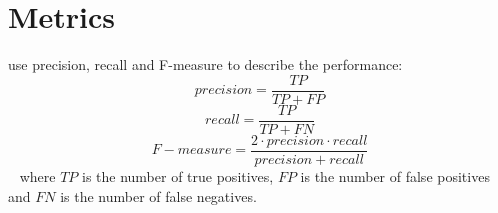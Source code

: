 \section{Metrics}
\label{sec:metrics}

\citet{chen_web_2008} use precision, recall and F-measure to describe the performance:
$$precision = \frac{TP}{TP + FP}$$
$$recall = \frac{TP}{TP + FN}$$
$$F-measure = \frac{2 \cdot precision \cdot recall}{precision + recall}$$~\cite{chen_web_2008,abbasi_writeprints_2008}
where $TP$ is the number of true positives, $FP$ is the number of false positives 
and $FN$ is the number of false negatives.